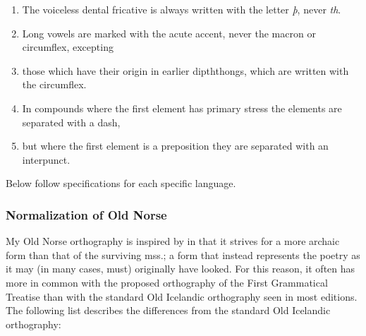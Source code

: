    \begin{enumerate}
    \item The voiceless dental fricative is always written with the letter \emph{þ}, never \emph{th}.
    \item Long vowels are marked with the acute accent, never the macron or circumflex, excepting
    \item those which have their origin in earlier dipththongs, which are written with the circumflex.
    \item In compounds where the first element has primary stress the elements are separated with a dash,
    \item but where the first element is a preposition they are separated with an interpunct.
    \end{enumerate}

    Below follow specifications for each specific language.

    \subsubsection{Normalization of Old Norse}

    My Old Norse orthography is inspired by \textcite{FinnurEdda} in that it strives for a more archaic form than that of the surviving mss.; a form that instead represents the poetry as it may (in many cases, must) originally have looked. For this reason, it often has more in common with the proposed orthography of the First Grammatical Treatise than with the standard Old Icelandic orthography seen in most editions. The following list describes the differences from the standard Old Icelandic orthography:

